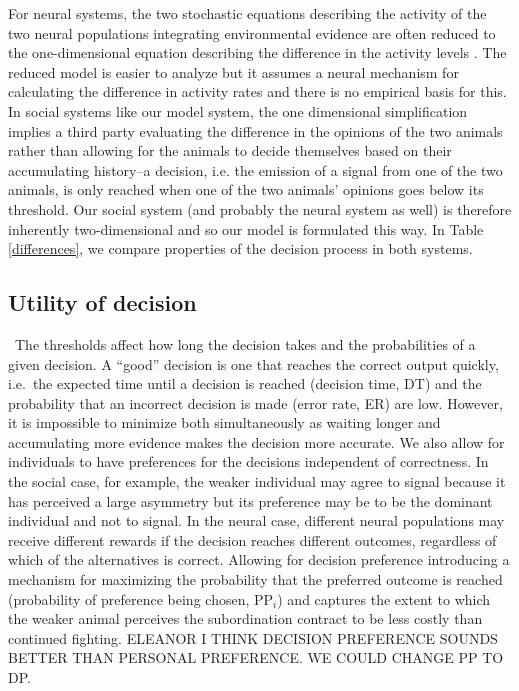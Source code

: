 \documentclass{article}
\begin{document}
For neural systems, the two stochastic equations describing the activity of the two neural populations integrating environmental evidence are often reduced to the one-dimensional equation describing the difference in the activity levels \cite{Brown:2005fk,Bogacz:2006uq,Feng:2009kl}. The reduced model is easier to analyze but it assumes a neural mechanism for calculating the difference in activity rates and there is no empirical basis for this. In social systems like our model system, the one dimensional simplification implies a third party evaluating the difference in the opinions of the two animals rather than allowing for the animals to decide themselves based on their accumulating history--a decision, i.e. the emission of a signal from one of the two animals, is only reached when one of the two animals' opinions goes below its threshold. Our social system (and probably the neural system as well) is therefore inherently two-dimensional and so our model is formulated this way.  In Table \ref{differences}, we compare properties of the decision process in both systems.

\subsection*{Utility of decision }
\ The thresholds affect how long the decision takes and the probabilities of a given decision.  A ``good'' decision is one that reaches the correct output quickly, i.e.\ the expected time until a decision is reached (decision time, DT) and the probability that an incorrect decision is made (error rate, ER) are low.  However, it is impossible to minimize both simultaneously as waiting longer and accumulating more evidence makes the decision more accurate.  We also allow for individuals to have preferences for the decisions independent of correctness.  In the social case, for example, the weaker individual may agree to signal because it has perceived a large asymmetry but its preference may be to be the dominant individual and not to signal. In the neural case, different neural populations may receive different rewards if the decision reaches different outcomes, regardless of which of the alternatives is correct. Allowing for decision preference introducing a mechanism for maximizing the probability that the preferred outcome is reached (probability of preference being chosen, $\text{PP}_i$) and captures the extent to which the weaker animal perceives the subordination contract to be less costly than continued fighting.  ELEANOR I THINK DECISION PREFERENCE SOUNDS BETTER THAN PERSONAL PREFERENCE. WE COULD CHANGE PP TO DP.
\end{document}
